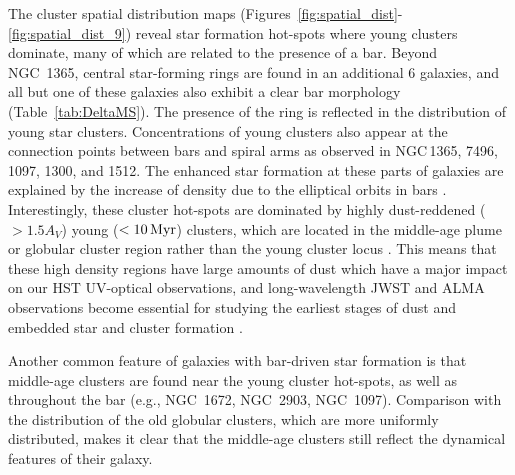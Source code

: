 \documentclass[linenumbers]{aastex63}
\begin{document}
{ The cluster spatial distribution maps (Figures~\ref{fig:spatial_dist}-\ref{fig:spatial_dist_9}) reveal star formation hot-spots where young clusters dominate, many of which are related to the presence of a bar. %
Beyond NGC~1365, central star-forming rings are found in an additional 6 galaxies, and all but one of these galaxies also exhibit 
a clear bar morphology (Table~\ref{tab:DeltaMS}).  The presence of the ring is reflected in the distribution of young star clusters.
Concentrations of young clusters also appear at the connection points between bars and spiral arms as observed in NGC\,1365, 7496, 1097, 1300, and 1512. The enhanced star formation at these parts of galaxies are explained by the increase of density due to the elliptical orbits in bars \citep[e.g.][]{nguyen_luong_w43_2011,beuther_interactions_2017}. 
Interestingly, these cluster hot-spots are dominated by highly dust-reddened ($>1.5 A_V$) young ($<{\rm 10\,Myr}$) clusters, which are located in the middle-age plume or globular cluster region rather than the young cluster locus \citep{whitmore_improving_2023, thilker23sed}. This means that these high density regions have large amounts of dust which have a major impact on our HST UV-optical observations, and long-wavelength JWST and ALMA observations become essential for studying the earliest stages of dust and embedded star and cluster formation \citep[e.g.][and Sun et al. in prep.]{johnson_physical_2015, leroy_phangs-alma_2021, emig_super_2020,rico-villas_super_2020, levy_outflows_2021, levy_morpho-kinematic_2022, schinnerer_phangs-jwst_2023, whitmore_phangs-jwst_2023}.

Another common feature of galaxies with bar-driven star formation is that middle-age clusters are found near the young cluster hot-spots, as well as throughout the bar (e.g., NGC~1672, NGC~2903, NGC~1097).  Comparison with the distribution of the old globular clusters, which are more uniformly distributed, makes it clear that the middle-age clusters still reflect the dynamical features of their galaxy.

}
\end{document}

